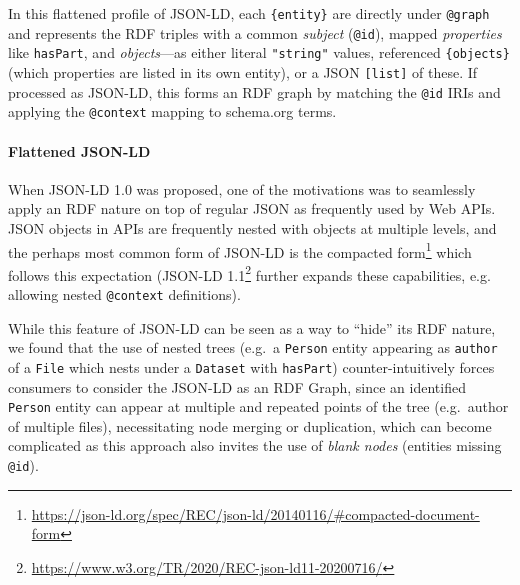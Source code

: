  

In this flattened profile of JSON-LD, each \texttt{\{entity\}} are
directly under \texttt{@graph} and represents the RDF triples with a
common \emph{subject} (\texttt{@id}), mapped \emph{properties} like
\texttt{hasPart}, and \emph{objects}---as either literal
\texttt{"string"} values, referenced \texttt{\{objects\}} (which
properties are listed in its own entity), or a JSON \texttt{{[}list{]}}
of these. If processed as JSON-LD, this forms an RDF graph by matching
the \texttt{@id} IRIs and applying the \texttt{@context} mapping to
schema.org terms. \normalsize

\paragraph{Flattened JSON-LD}\label{ch5:flattened-json-ld}

When \acrshort{JSON-LD} 1.0 \cite{Sporny 2014}
was
proposed, one of the motivations was to seamlessly apply an RDF nature
on top of regular JSON as frequently used by Web APIs. JSON objects in
APIs are frequently nested with objects at multiple levels, and the
perhaps most common form of JSON-LD is the compacted
form\footnote{\url{https://json-ld.org/spec/REC/json-ld/20140116/\#compacted-document-form}}
which follows this expectation (JSON-LD
1.1\footnote{\url{https://www.w3.org/TR/2020/REC-json-ld11-20200716/}} further
expands these capabilities, e.g. allowing nested \texttt{@context} definitions).


While this feature of JSON-LD can be seen as a way to ``hide'' its RDF
nature, we found that the use of nested trees (e.g.~a \texttt{Person}
entity appearing as \texttt{author} of a \texttt{File} which nests under
a \texttt{Dataset} with \texttt{hasPart}) counter-intuitively forces
consumers to consider the JSON-LD as an RDF Graph, since an identified
\texttt{Person} entity can appear at multiple and repeated points of the
tree (e.g.~author of multiple files), necessitating node merging or
duplication, which can become complicated as this approach also invites
the use of \emph{blank nodes} (entities missing \texttt{@id}).

